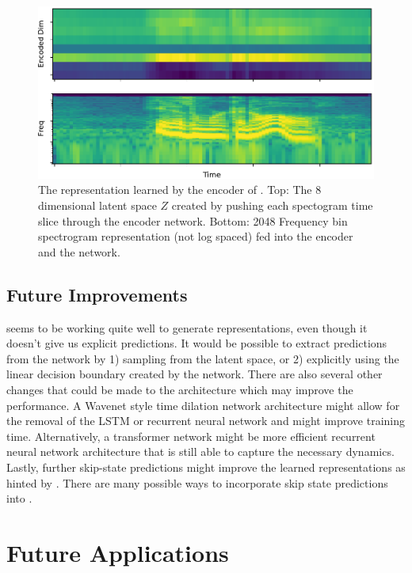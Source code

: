 \begin{figure}[tbp] 
  \centering
  \includegraphics[width=\textwidth]{figures/encoder.pdf}
  \caption[8 dimensional $Z$ space learned by Contrastive Predictive Coding.]
{The representation learned by the encoder of \CPC. Top: The 8 dimensional latent space $Z$ created by pushing each spectogram time slice through the encoder network. Bottom: 2048 Frequency bin spectrogram representation (not log spaced) fed into the encoder and the \CPC network.
}
  \label{fig:encoder}
\end{figure}

\subsection{Future Improvements}
\CPC seems to be working quite well to generate representations, even though it doesn't give us explicit predictions. It would be possible to extract predictions from the \CPC network by 1) sampling from the latent space, or 2) explicitly using the linear decision boundary created by the network. There are also several other changes that could be made to the architecture which may improve the performance. A Wavenet \cite{van2016wavenet} style time dilation network architecture might allow for the removal of the LSTM or recurrent neural network and might improve training time. Alternatively, a transformer network \cite{vaswani2017attention} might be more efficient recurrent neural network architecture that is still able to capture the necessary dynamics. Lastly, further skip-state predictions might improve the learned representations as hinted by \cite{gregor2018temporal}. There are many possible ways to incorporate skip state predictions into \CPC.

\section{Future Applications}

